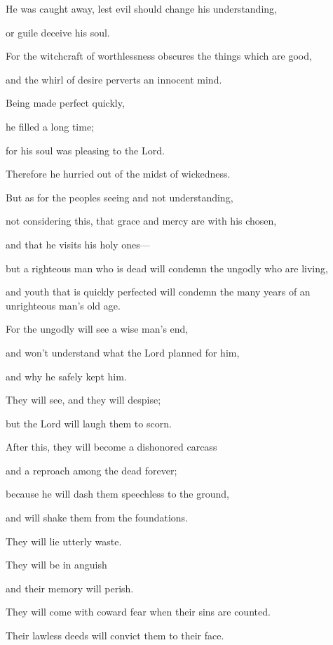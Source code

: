 {\par }{\Q {}He was caught away, lest evil should change his understanding,
\par }{\QB or guile deceive his soul.
\par }{\Q {}For the witchcraft of worthlessness obscures the things which are good,
\par }{\QB and the whirl of desire perverts an innocent mind.
\par }{\Q {}Being made perfect quickly,
\par }{\QB he filled a long time;
\par }{\QB {}for his soul was pleasing to the Lord.
\par }{\QB Therefore he hurried out of the midst of wickedness.
\par }{\Q {}But as for the peoples seeing and not understanding,
\par }{\QB not considering this, that grace and mercy are with his chosen,
\par }{\QB and that he visits his holy ones—
\par }{\Q {}but a righteous man who is dead will condemn the ungodly who are living,
\par }{\QB and youth that is quickly perfected will condemn the many years of an unrighteous man’s old age.
\par }{\Q {}For the ungodly will see a wise man’s end,
\par }{\QB and won’t understand what the Lord planned for him,
\par }{\QB and why he safely kept him.
\par }{\Q {}They will see, and they will despise;
\par }{\QB but the Lord will laugh them to scorn.
\par }{\Q After this, they will become a dishonored carcass
\par }{\QB and a reproach among the dead forever;
\par }{\Q {}because he will dash them speechless to the ground,
\par }{\QB and will shake them from the foundations.
\par }{\Q They will lie utterly waste.
\par }{\QB They will be in anguish
\par }{\QB and their memory will perish.
\par }{\BB \par }{\Q {}They will come with coward fear when their sins are counted.
\par }{\QB Their lawless deeds will convict them to their face.

}
